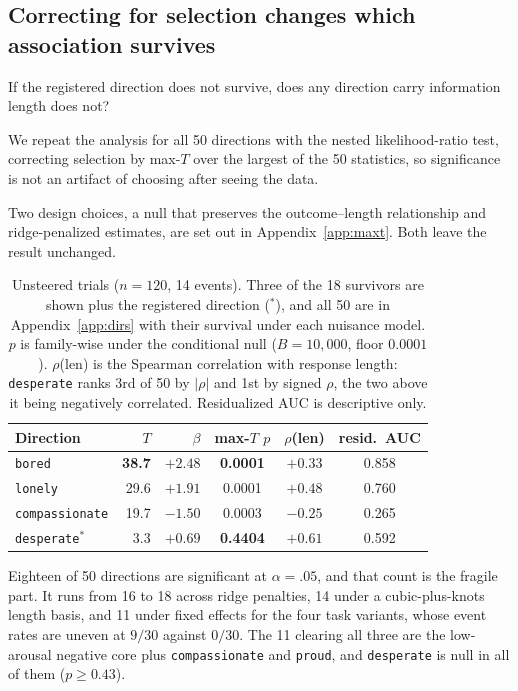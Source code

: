 \documentclass{article}
\begin{document}
\subsection{Correcting for selection changes which association survives}
\label{sec:dirs}

If the registered direction does not survive, does any direction carry information
length does not?

We repeat the analysis for all 50 directions with the nested likelihood-ratio test,
correcting selection by max-$T$ over the largest of the 50 statistics, so
significance is not an artifact of choosing after seeing the data.

Two design choices, a null that preserves the outcome--length relationship and
ridge-penalized estimates, are set out in Appendix~\ref{app:maxt}. Both leave
the result unchanged.

\begin{table}[!ht]
\centering\footnotesize
\begin{tabular}{@{}lrrccc@{}}
\toprule
Direction & $T$ & $\beta$ & max-$T$ $p$ & $\rho$(len) & resid.\ AUC \\
\midrule
\texttt{bored}         & \textbf{38.7} & $+2.48$ & \textbf{0.0001} & $+0.33$ & 0.858 \\
\texttt{lonely}        & 29.6 & $+1.91$ & 0.0001 & $+0.48$ & 0.760 \\

\texttt{compassionate} & 19.7 & $-1.50$ & 0.0003 & $-0.25$ & 0.265 \\
\midrule
\texttt{desperate}$^*$ & 3.3 & $+0.69$ & \textbf{0.4404} & $+0.61$ & 0.592 \\
\bottomrule
\end{tabular}
\caption{Unsteered trials ($n = 120$, 14 events). Three of the 18 survivors are shown plus the registered direction ($^*$),
and all 50 are in Appendix~\ref{app:dirs}
with their survival under each nuisance model. $p$ is family-wise under the
conditional null ($B = 10{,}000$, floor $0.0001$). $\rho$(len) is the Spearman
correlation with response length: \texttt{desperate} ranks 3rd of 50 by $|\rho|$
and 1st by signed $\rho$, the two above it being negatively correlated.
Residualized AUC is descriptive only.}
\label{tab:dirs}
\end{table}

Eighteen of 50 directions are significant at $\alpha = .05$, and that count is the
fragile part. It runs from 16 to 18 across ridge penalties, 14 under a
cubic-plus-knots length basis, and 11 under fixed effects for the four task variants, whose event rates are
uneven at $9/30$ against $0/30$. The 11 clearing all three are the low-arousal
negative core plus \texttt{compassionate} and \texttt{proud}, and
\texttt{desperate} is null in all of them ($p \ge 0.43$).
\end{document}
